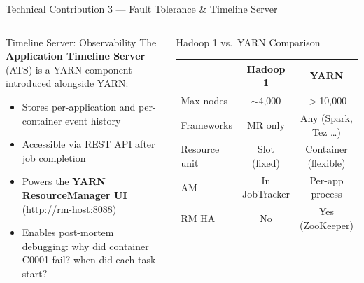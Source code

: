 \documentclass[aspectratio=169,10pt]{beamer}
\begin{document}
\begin{frame}{Technical Contribution 3 — Fault Tolerance \& Timeline Server}
\begin{columns}[T]
      \begin{block}{Timeline Server: Observability}
        The \textbf{Application Timeline Server} (ATS) is a
        YARN component introduced alongside YARN:
        \begin{itemize}
          \item Stores per-application and per-container event history
          \item Accessible via REST API after job completion
          \item Powers the \textbf{YARN ResourceManager UI}
                (http://rm-host:8088)
          \item Enables post-mortem debugging:
                why did container C0001 fail? when did each task start?
        \end{itemize}
      \end{block}
      \vspace{5pt}
      \begin{exampleblock}{Hadoop 1 vs.\ YARN Comparison}
        \renewcommand{\arraystretch}{1.2}
        \scriptsize
        \begin{tabular}{@{}lcc@{}}
          \toprule
          & \textbf{Hadoop 1} & \textbf{YARN} \\
          \midrule
          Max nodes     & $\sim$4{,}000 & $>$10{,}000 \\
          Frameworks    & MR only       & Any (Spark, Tez \ldots) \\
          Resource unit & Slot (fixed)  & Container (flexible) \\
          AM            & In JobTracker & Per-app process \\
          RM HA         & No            & Yes (ZooKeeper) \\
          \bottomrule
        \end{tabular}
      \end{exampleblock}
  \end{columns}
\end{frame}
\end{document}
